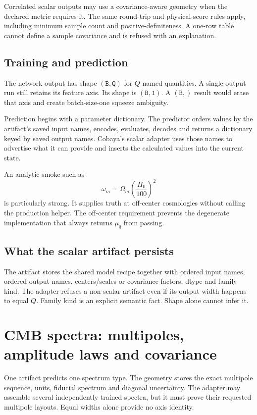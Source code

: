\documentclass[10pt,aps,prd,twocolumn,nofootinbib]{revtex4-2}
\newcommand{\shape}[1]{\ensuremath{\mathtt{#1}}}
\begin{document}
Correlated scalar outputs may use a covariance-aware geometry when the
declared metric requires it.  The same round-trip and physical-score rules
apply, including minimum sample count and positive-definiteness.  A one-row
table cannot define a sample covariance and is refused with an explanation.

\subsection{Training and prediction}

The network output has shape \shape{(B,Q)} for \(Q\) named quantities.  A
single-output run still retains its feature axis.  Its shape is \shape{(B,1)}.
A \shape{(B,)} result would erase that axis and create batch-size-one squeeze
ambiguity.

Prediction begins with a parameter dictionary.  The predictor orders values
by the artifact's saved input names, encodes, evaluates, decodes and returns a
dictionary keyed by saved output names.  Cobaya's scalar adapter uses those
names to advertise what it can provide and inserts the calculated values into
the current state.

An analytic smoke such as
\begin{equation*}
  \omega_m=\Omega_m\left(\frac{H_0}{100}\right)^2
\end{equation*}
is particularly strong.  It supplies truth at off-center cosmologies without
calling the production helper.  The off-center requirement prevents the
degenerate implementation that always returns \(\mu_q\) from passing.

\subsection{What the scalar artifact persists}

The artifact stores the shared model recipe together with ordered input
names, ordered output names, centers/scales or covariance factors, dtype and
family kind.  The adapter refuses a non-scalar artifact even if its output
width happens to equal \(Q\).  Family kind is an explicit semantic fact.  Shape
alone cannot infer it.

\section{CMB spectra: multipoles, amplitude laws and covariance}
\label{sec:cmb}

One artifact predicts one spectrum type.  The geometry stores the exact
multipole sequence, units, fiducial spectrum and diagonal uncertainty.  The
adapter may assemble several independently trained spectra, but it must prove
their requested multipole layouts.  Equal widths alone provide no axis
identity.
\end{document}
